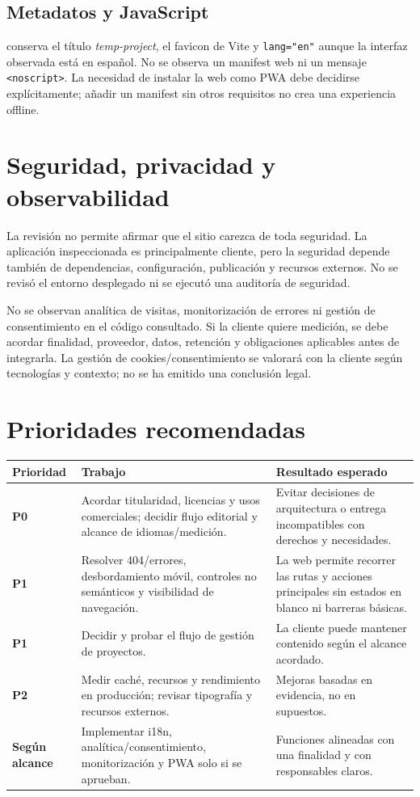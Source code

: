 \documentclass[11pt,a4paper]{report}
\begin{document}
\section{Metadatos y JavaScript}

 conserva el título \textit{temp-project}, el favicon de Vite y \texttt{lang="en"} aunque la interfaz observada está en español. No se observa un manifest web ni un mensaje \texttt{\textless noscript\textgreater}. La necesidad de instalar la web como PWA debe decidirse explícitamente; añadir un manifest sin otros requisitos no crea una experiencia offline.

\chapter{Seguridad, privacidad y observabilidad}

La revisión no permite afirmar que el sitio carezca de toda seguridad. La aplicación inspeccionada es principalmente cliente, pero la seguridad depende también de dependencias, configuración, publicación y recursos externos. No se revisó el entorno desplegado ni se ejecutó una auditoría de seguridad.

No se observan analítica de visitas, monitorización de errores ni gestión de consentimiento en el código consultado. Si la cliente quiere medición, se debe acordar finalidad, proveedor, datos, retención y obligaciones aplicables antes de integrarla. La gestión de cookies/consentimiento se valorará con la cliente según tecnologías y contexto; no se ha emitido una conclusión legal.

\chapter{Prioridades recomendadas}

\begin{tabularx}{\textwidth}{>{\bfseries}p{20mm} p{47mm} X}
\toprule
Prioridad & Trabajo & Resultado esperado \\
\midrule
P0 & Acordar titularidad, licencias y usos comerciales; decidir flujo editorial y alcance de idiomas/medición. & Evitar decisiones de arquitectura o entrega incompatibles con derechos y necesidades. \\
P1 & Resolver 404/errores, desbordamiento móvil, controles no semánticos y visibilidad de navegación. & La web permite recorrer las rutas y acciones principales sin estados en blanco ni barreras básicas. \\
P1 & Decidir y probar el flujo de gestión de proyectos. & La cliente puede mantener contenido según el alcance acordado. \\
P2 & Medir caché, recursos y rendimiento en producción; revisar tipografía y recursos externos. & Mejoras basadas en evidencia, no en supuestos. \\
Según alcance & Implementar i18n, analítica/consentimiento, monitorización y PWA solo si se aprueban. & Funciones alineadas con una finalidad y con responsables claros. \\
\bottomrule
\end{tabularx}
\end{document}
